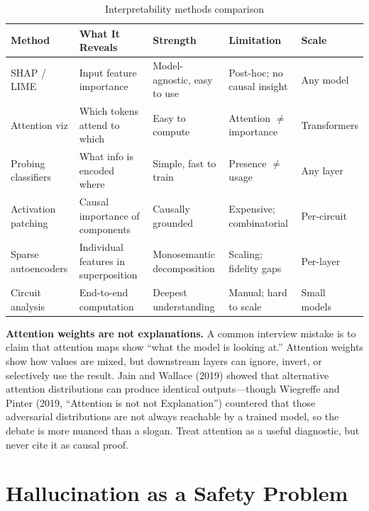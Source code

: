 \begin{table}[H]
\centering
\caption{Interpretability methods comparison}
\begin{tabularx}{\textwidth}{lXXXl}
\toprule
\textbf{Method} & \textbf{What It Reveals} & \textbf{Strength} & \textbf{Limitation} & \textbf{Scale} \\
\midrule
SHAP / LIME & Input feature importance & Model-agnostic, easy to use & Post-hoc; no causal insight & Any model \\
Attention viz & Which tokens attend to which & Easy to compute & Attention $\neq$ importance & Transformers \\
Probing classifiers & What info is encoded where & Simple, fast to train & Presence $\neq$ usage & Any layer \\
Activation patching & Causal importance of components & Causally grounded & Expensive; combinatorial & Per-circuit \\
Sparse autoencoders & Individual features in superposition & Monosemantic decomposition & Scaling; fidelity gaps & Per-layer \\
Circuit analysis & End-to-end computation & Deepest understanding & Manual; hard to scale & Small models \\
\bottomrule
\end{tabularx}
\end{table}

\begin{warningbox}
\textbf{Attention weights are not explanations.} A common interview mistake is to claim that attention maps show ``what the model is looking at.'' Attention weights show how values are mixed, but downstream layers can ignore, invert, or selectively use the result. Jain and Wallace (2019) showed that alternative attention distributions can produce identical outputs---though Wiegreffe and Pinter (2019, ``Attention is not not Explanation'') countered that those adversarial distributions are not always reachable by a trained model, so the debate is more nuanced than a slogan. Treat attention as a useful diagnostic, but never cite it as causal proof.
\end{warningbox}

\section{Hallucination as a Safety Problem}
\label{sec:hallucination}

